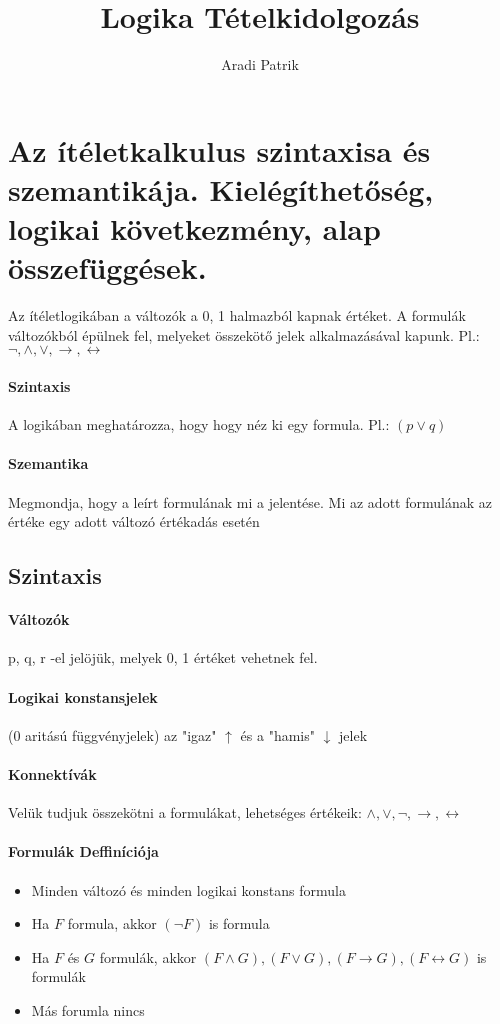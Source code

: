 \documentclass[10pt,a4paper]{article}
\author{Aradi Patrik}
\title{Logika Tételkidolgozás}
\begin{document}
\maketitle
\newpage
\section{Az ítéletkalkulus szintaxisa és szemantikája. Kielégíthetőség, logikai következmény, alap összefüggések.}

Az ítéletlogikában a változók a {0, 1} halmazból kapnak értéket. \newline A formulák változókból épülnek fel, melyeket összekötő jelek alkalmazásával kapunk. Pl.: $\neg, \wedge, \vee, \rightarrow, \leftrightarrow$
\paragraph{Szintaxis}
A logikában meghatározza, hogy hogy néz ki egy formula. \newline Pl.: $(p \vee q)$
\paragraph{Szemantika}
Megmondja, hogy a leírt formulának mi a jelentése. Mi az adott formulának az értéke egy adott változó értékadás esetén
\subsection{Szintaxis}
\paragraph{Változók}
p, q, r -el jelöjük, melyek {0, 1} értéket vehetnek fel.
\paragraph{Logikai konstansjelek}
(0 aritású függvényjelek) az "igaz" $\uparrow$ és a "hamis" $\downarrow$ jelek
\paragraph{Konnektívák}
Velük tudjuk összekötni a formulákat, lehetséges értékeik: $\wedge, \vee, \neg, \rightarrow, \leftrightarrow $
\paragraph{Formulák Deffiníciója}
\begin{itemize}
\item Minden változó és minden logikai konstans formula
\item Ha $F$ formula, akkor $(\neg F)$ is formula
\item Ha $F$ és $G$ formulák, akkor $(F \wedge G), (F \vee G), (F \rightarrow G), (F \leftrightarrow G)$ is formulák
\item Más forumla nincs
\end{itemize}
\end{document}
